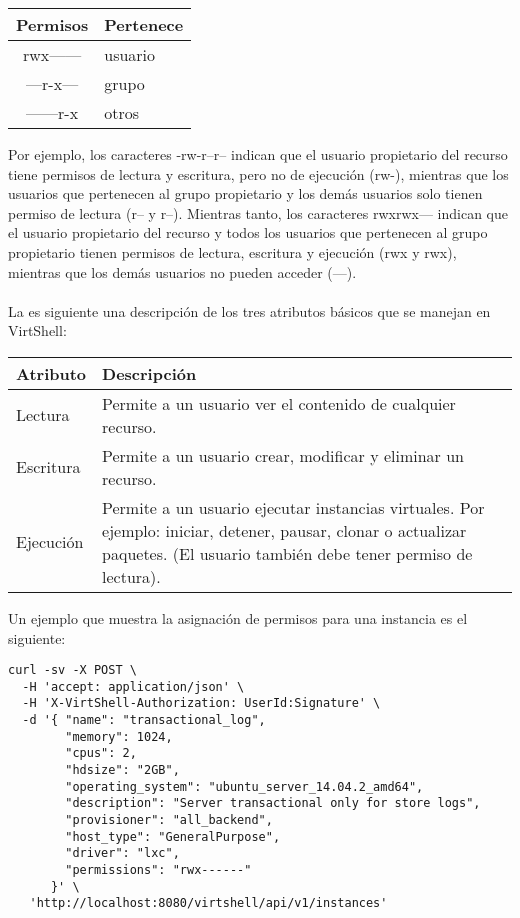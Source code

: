 \begin{center}
 \label{tab:permisos}
 \begin{tabular}{| c | p{2.2cm} |}
 \hline
  \rowcolor{blueapi}
  \textbf{Permisos} & \textbf{Pertenece}  \\ [0.2ex] 
  \hline\hline
  rwx------ &  usuario \\
  \hline
  ---r-x--- & grupo \\  
  \hline
  ------r-x & otros \\
  \hline
\end{tabular}
\end{center}

Por ejemplo, los caracteres -rw-r--r-- indican que el usuario propietario del recurso tiene permisos de lectura y escritura, pero no de ejecución (rw-), mientras que los usuarios que pertenecen al grupo propietario y los demás usuarios solo tienen permiso de lectura (r-- y r--). Mientras tanto, los caracteres rwxrwx--- indican que el usuario propietario del recurso y todos los usuarios que pertenecen al grupo propietario tienen permisos de lectura, escritura y ejecución (rwx y rwx), mientras que los demás usuarios no pueden acceder (---). \\
\\
La es siguiente una descripción de los tres atributos básicos que se manejan en VirtShell:

\begin{center}
 \begin{tabular}{| l | p{12cm} |}
 \hline
  \rowcolor{blueapi}
  \textbf{Atributo} & \textbf{Descripción}  \\ [0.2ex] 
  \hline\hline
  Lectura &  Permite a un usuario ver el contenido de cualquier recurso. \\
  \hline
  Escritura & Permite a un usuario crear, modificar y eliminar un recurso. \\  
  \hline
  Ejecución & Permite a un usuario ejecutar instancias virtuales. 
  Por ejemplo: iniciar, detener, pausar, clonar o actualizar paquetes. 
   (El usuario también debe tener permiso de lectura). \\
  \hline
\end{tabular}
\end{center}

Un ejemplo que muestra la asignación de permisos para una instancia es el siguiente:

\medskip
\begin{lstlisting}[style=json]
curl -sv -X POST \
  -H 'accept: application/json' \
  -H 'X-VirtShell-Authorization: UserId:Signature' \
  -d '{ "name": "transactional_log",
        "memory": 1024,
        "cpus": 2,
        "hdsize": "2GB",
        "operating_system": "ubuntu_server_14.04.2_amd64",
        "description": "Server transactional only for store logs", 
        "provisioner": "all_backend",
        "host_type": "GeneralPurpose",
        "driver": "lxc",
        "permissions": "rwx------"
      }' \
   'http://localhost:8080/virtshell/api/v1/instances'
\end{lstlisting}

